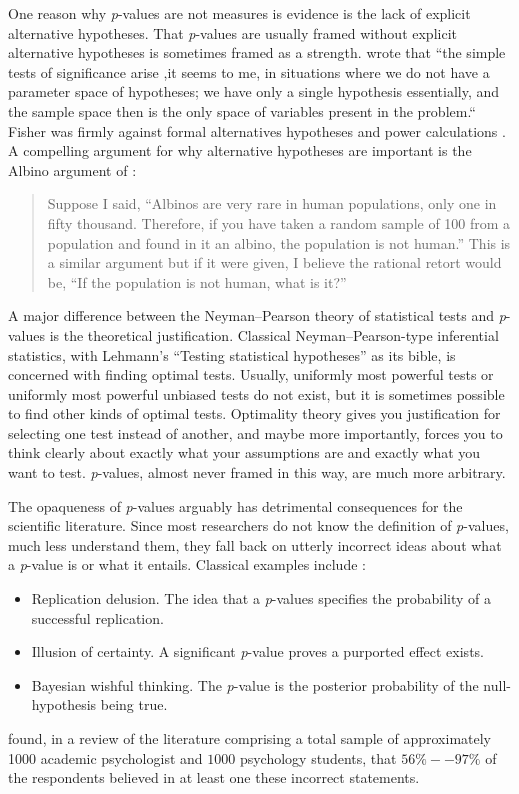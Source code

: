 One reason why \emph{p}-values are not measures is evidence is the lack of explicit alternative hypotheses. That \emph{p}-values are usually framed without explicit alternative hypotheses is sometimes framed as a strength. \textcite[p. 308]{Barnard1962-rz} wrote that ``the simple tests of significance arise ,it seems to me, in situations where we do not have a parameter space of hypotheses; we have only a single hypothesis essentially, and the sample space then is the only space of variables present in the problem.`` Fisher was firmly against formal alternatives hypotheses and power calculations \parencite{Lehmann1993-oa}. A compelling argument for why alternative hypotheses are important is the Albino argument of \textcite{Berkson1942-hj}:
\begin{quotation}
Suppose I said, \textquotedblleft Albinos are very rare in human populations, only one in fifty thousand. Therefore, if you have taken a random sample of 100 from a population and found in it an albino, the population is not human.\textquotedblright{} This is a similar argument but if it were given, I believe the rational retort would be, \textquotedblleft If the population is not human, what is it?\textquotedblright{} 
\end{quotation}
A major difference between the Neyman--Pearson theory of statistical tests and \textit{p}-values is the theoretical justification. Classical Neyman--Pearson-type inferential statistics, with Lehmann's ``Testing statistical hypotheses'' \parencite{Lehmann2005-sp} as its bible, is concerned with finding optimal tests. Usually, uniformly most powerful tests or uniformly most powerful unbiased tests do not exist, but it is sometimes possible to find other kinds of optimal tests. Optimality theory gives you justification for selecting one test instead of another, and maybe more importantly, forces you to think clearly about exactly what your assumptions are and exactly what you want to test. \emph{p}-values, almost never framed in this way, are much more arbitrary. 

The opaqueness of \textit{p}-values arguably has detrimental consequences for the scientific literature. Since most researchers do not know the definition of \textit{p}-values, much less understand them, they fall back on utterly incorrect ideas about what a \textit{p}-value is or what it entails. Classical examples include \parencite{Gigerenzer2018-oi}:
\begin{itemize}
    \item Replication delusion. The idea that a  \textit{p}-values specifies the probability of a successful replication.
    \item Illusion of certainty. A significant \textit{p}-value proves a purported effect exists.
    \item Bayesian wishful thinking. The \textit{p}-value is the posterior probability of the null-hypothesis being true.
\end{itemize}
\textcite{Gigerenzer2018-oi} found, in a review of the literature comprising a total sample of approximately 1000 academic psychologist and $1000$ psychology students, that $56\% -- 97\%$ of the respondents believed in at least one these incorrect statements. 

